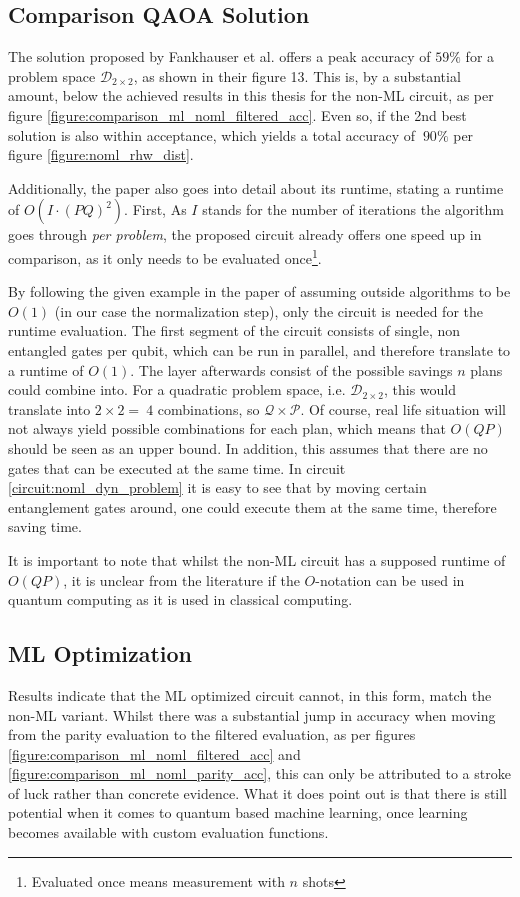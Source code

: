 \subsection{Comparison QAOA Solution}
The solution proposed by Fankhauser et al.\cite{fankhauser_multiple_2021} offers a peak accuracy of $59\%$ for a problem space $\mathcal{D}_{2\times2}$, as shown in their figure 13. This is, by a substantial amount, below the achieved results in this thesis for the non-ML circuit, as per figure \ref{figure:comparison_ml_noml_filtered_acc}. Even so, if the 2nd best solution is also within acceptance, which yields a total accuracy of $~90\%$ per figure \ref{figure:noml_rhw_dist}. \par
Additionally, the paper also goes into detail about its runtime, stating a runtime of $O(I · (PQ)^2)$. First, As $I$ stands for the number of iterations the algorithm goes through \emph{per problem}, the proposed circuit already offers one speed up in comparison, as it only needs to be evaluated once\footnote{Evaluated once means measurement with $n$ shots}. \par
By following the given example in the paper of assuming outside algorithms to be $O(1)$ (in our case the normalization step), only the circuit is needed for the runtime evaluation. The first segment of the circuit consists of single, non entangled gates per qubit, which can be run in parallel, and therefore translate to a runtime of $O(1)$.
The layer afterwards consist of the possible savings $n$ plans could combine into. For a quadratic problem space, i.e. $\mathcal{D}_{2\times2}$, this would translate into $2\times2 =\ 4$ combinations, so $\mathcal{Q}\times\mathcal{P}$. Of course, real life situation will not always yield possible combinations for each plan, which means that $O(QP)$ should be seen as an upper bound. In addition, this assumes that there are no gates that can be executed at the same time. In circuit \ref{circuit:noml_dyn_problem} it is easy to see that by moving certain entanglement gates around, one could execute them at the same time, therefore saving time. \par
It is important to note that whilst the non-ML circuit has a supposed runtime of $O(QP)$, it is unclear from the literature if the $O$-notation can be used in quantum computing as it is used in classical computing.

\subsection{ML Optimization}
Results indicate that the ML optimized circuit cannot, in this form, match the non-ML variant. Whilst there was a substantial jump in accuracy when moving from the parity evaluation to the filtered evaluation, as per figures \ref{figure:comparison_ml_noml_filtered_acc} and \ref{figure:comparison_ml_noml_parity_acc}, this can only be attributed to a stroke of luck rather than concrete evidence. What it does point out is that there is still potential when it comes to quantum based machine learning, once learning becomes available with custom evaluation functions. \par



